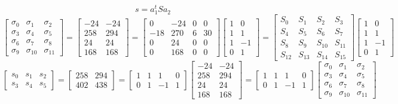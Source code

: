 \documentclass{article}%
\begin{document}
\[%
s = a_1^t S a_2%
\]%
\[%
\left[\begin{matrix}\sigma_{0} & \sigma_{1} & \sigma_{2}\\\sigma_{3} & \sigma_{4} & \sigma_{5}\\\sigma_{6} & \sigma_{7} & \sigma_{8}\\\sigma_{9} & \sigma_{10} & \sigma_{11}\end{matrix}\right] = \left[\begin{matrix}-24 & -24\\258 & 294\\24 & 24\\168 & 168\end{matrix}\right] = \left[\begin{matrix}0 & -24 & 0 & 0\\-18 & 270 & 6 & 30\\0 & 24 & 0 & 0\\0 & 168 & 0 & 0\end{matrix}\right] \left[\begin{matrix}1 & 0\\1 & 1\\1 & -1\\0 & 1\end{matrix}\right] = \left[\begin{matrix}S_{0} & S_{1} & S_{2} & S_{3}\\S_{4} & S_{5} & S_{6} & S_{7}\\S_{8} & S_{9} & S_{10} & S_{11}\\S_{12} & S_{13} & S_{14} & S_{15}\end{matrix}\right] \left[\begin{matrix}1 & 0\\1 & 1\\1 & -1\\0 & 1\end{matrix}\right]%
\]%
\[%
\left[\begin{matrix}s_{0} & s_{1} & s_{2}\\s_{3} & s_{4} & s_{5}\end{matrix}\right] = \left[\begin{matrix}258 & 294\\402 & 438\end{matrix}\right] = \left[\begin{matrix}1 & 1 & 1 & 0\\0 & 1 & -1 & 1\end{matrix}\right] \left[\begin{matrix}-24 & -24\\258 & 294\\24 & 24\\168 & 168\end{matrix}\right] = \left[\begin{matrix}1 & 1 & 1 & 0\\0 & 1 & -1 & 1\end{matrix}\right] \left[\begin{matrix}\sigma_{0} & \sigma_{1} & \sigma_{2}\\\sigma_{3} & \sigma_{4} & \sigma_{5}\\\sigma_{6} & \sigma_{7} & \sigma_{8}\\\sigma_{9} & \sigma_{10} & \sigma_{11}\end{matrix}\right]%
\]%
\end{document}
